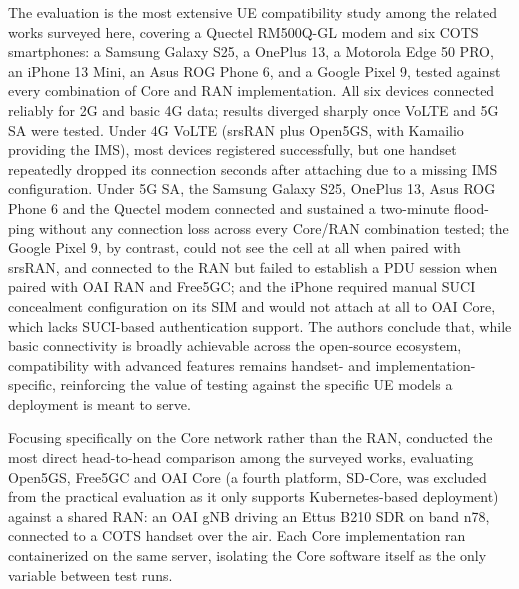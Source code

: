The evaluation is the most extensive \gls{UE} compatibility study among the related works surveyed here, covering a Quectel RM500Q-GL modem and six \gls{COTS} smartphones: a Samsung Galaxy S25, a OnePlus 13, a Motorola Edge 50 PRO, an iPhone 13 Mini, an Asus ROG Phone 6, and a Google Pixel 9, tested against every combination of Core and \gls{RAN} implementation. All six devices connected reliably for 2G and basic 4G data; results diverged sharply once VoLTE and 5G \gls{SA} were tested. Under 4G VoLTE (srsRAN plus Open5GS, with Kamailio providing the IMS), most devices registered successfully, but one handset repeatedly dropped its connection seconds after attaching due to a missing IMS configuration. Under 5G \gls{SA}, the Samsung Galaxy S25, OnePlus 13, Asus ROG Phone 6 and the Quectel modem connected and sustained a two-minute flood-ping without any connection loss across every Core/\gls{RAN} combination tested; the Google Pixel 9, by contrast, could not see the cell at all when paired with srsRAN, and connected to the \gls{RAN} but failed to establish a \gls{PDU} session when paired with \gls{OAI} \gls{RAN} and Free5GC; and the iPhone required manual \gls{SUCI} concealment configuration on its SIM and would not attach at all to \gls{OAI} Core, which lacks \gls{SUCI}-based authentication support. The authors conclude that, while basic connectivity is broadly achievable across the open-source ecosystem, compatibility with advanced features remains handset- and implementation-specific, reinforcing the value of testing against the specific \gls{UE} models a deployment is meant to serve.

Focusing specifically on the Core network rather than the \gls{RAN}, \textcite{barbosa2025opensource} conducted the most direct head-to-head comparison among the surveyed works, evaluating Open5GS, Free5GC and \gls{OAI} Core (a fourth platform, SD-Core, was excluded from the practical evaluation as it only supports Kubernetes-based deployment) against a shared \gls{RAN}: an \gls{OAI} \gls{gNB} driving an Ettus B210 \gls{SDR} on band n78, connected to a \gls{COTS} handset over the air. Each Core implementation ran containerized on the same server, isolating the Core software itself as the only variable between test runs.

